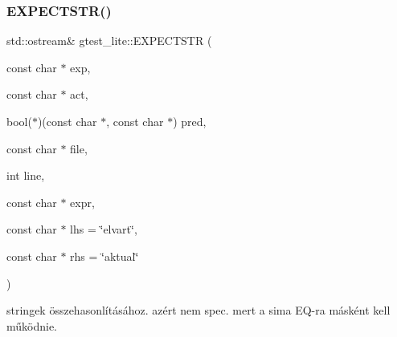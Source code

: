 \subsubsection{\texorpdfstring{EXPECTSTR()}{EXPECTSTR()}}
{\footnotesize\ttfamily std\+::ostream\& gtest\+\_\+lite\+::\+E\+X\+P\+E\+C\+T\+S\+TR (\begin{DoxyParamCaption}\item[{const char $\ast$}]{exp,  }\item[{const char $\ast$}]{act,  }\item[{bool($\ast$)(const char $\ast$, const char $\ast$)}]{pred,  }\item[{const char $\ast$}]{file,  }\item[{int}]{line,  }\item[{const char $\ast$}]{expr,  }\item[{const char $\ast$}]{lhs = {\ttfamily \char`\"{}elvart\char`\"{}},  }\item[{const char $\ast$}]{rhs = {\ttfamily \char`\"{}aktual\char`\"{}} }\end{DoxyParamCaption})\hspace{0.3cm}{\ttfamily [inline]}}

stringek összehasonlításához. azért nem spec. mert a sima E\+Q-\/ra másként kell működnie. 